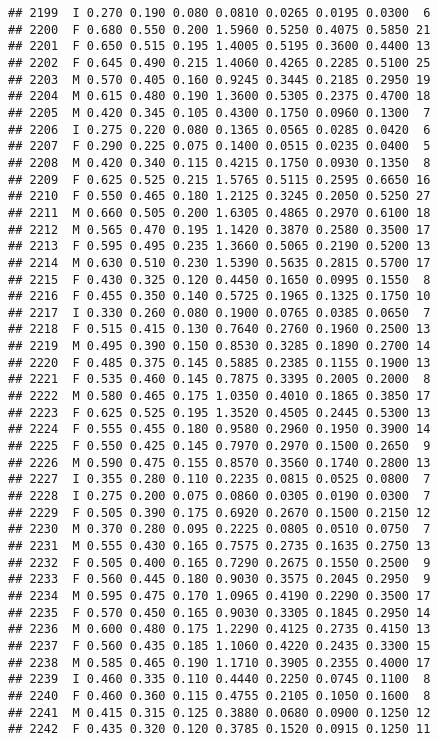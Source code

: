 \documentclass[
]{article}
\begin{document}
\begin{verbatim}
## 2199  I 0.270 0.190 0.080 0.0810 0.0265 0.0195 0.0300  6
## 2200  F 0.680 0.550 0.200 1.5960 0.5250 0.4075 0.5850 21
## 2201  F 0.650 0.515 0.195 1.4005 0.5195 0.3600 0.4400 13
## 2202  F 0.645 0.490 0.215 1.4060 0.4265 0.2285 0.5100 25
## 2203  M 0.570 0.405 0.160 0.9245 0.3445 0.2185 0.2950 19
## 2204  M 0.615 0.480 0.190 1.3600 0.5305 0.2375 0.4700 18
## 2205  M 0.420 0.345 0.105 0.4300 0.1750 0.0960 0.1300  7
## 2206  I 0.275 0.220 0.080 0.1365 0.0565 0.0285 0.0420  6
## 2207  F 0.290 0.225 0.075 0.1400 0.0515 0.0235 0.0400  5
## 2208  M 0.420 0.340 0.115 0.4215 0.1750 0.0930 0.1350  8
## 2209  F 0.625 0.525 0.215 1.5765 0.5115 0.2595 0.6650 16
## 2210  F 0.550 0.465 0.180 1.2125 0.3245 0.2050 0.5250 27
## 2211  M 0.660 0.505 0.200 1.6305 0.4865 0.2970 0.6100 18
## 2212  M 0.565 0.470 0.195 1.1420 0.3870 0.2580 0.3500 17
## 2213  F 0.595 0.495 0.235 1.3660 0.5065 0.2190 0.5200 13
## 2214  M 0.630 0.510 0.230 1.5390 0.5635 0.2815 0.5700 17
## 2215  F 0.430 0.325 0.120 0.4450 0.1650 0.0995 0.1550  8
## 2216  F 0.455 0.350 0.140 0.5725 0.1965 0.1325 0.1750 10
## 2217  I 0.330 0.260 0.080 0.1900 0.0765 0.0385 0.0650  7
## 2218  F 0.515 0.415 0.130 0.7640 0.2760 0.1960 0.2500 13
## 2219  M 0.495 0.390 0.150 0.8530 0.3285 0.1890 0.2700 14
## 2220  F 0.485 0.375 0.145 0.5885 0.2385 0.1155 0.1900 13
## 2221  F 0.535 0.460 0.145 0.7875 0.3395 0.2005 0.2000  8
## 2222  M 0.580 0.465 0.175 1.0350 0.4010 0.1865 0.3850 17
## 2223  F 0.625 0.525 0.195 1.3520 0.4505 0.2445 0.5300 13
## 2224  F 0.555 0.455 0.180 0.9580 0.2960 0.1950 0.3900 14
## 2225  F 0.550 0.425 0.145 0.7970 0.2970 0.1500 0.2650  9
## 2226  M 0.590 0.475 0.155 0.8570 0.3560 0.1740 0.2800 13
## 2227  I 0.355 0.280 0.110 0.2235 0.0815 0.0525 0.0800  7
## 2228  I 0.275 0.200 0.075 0.0860 0.0305 0.0190 0.0300  7
## 2229  F 0.505 0.390 0.175 0.6920 0.2670 0.1500 0.2150 12
## 2230  M 0.370 0.280 0.095 0.2225 0.0805 0.0510 0.0750  7
## 2231  M 0.555 0.430 0.165 0.7575 0.2735 0.1635 0.2750 13
## 2232  F 0.505 0.400 0.165 0.7290 0.2675 0.1550 0.2500  9
## 2233  F 0.560 0.445 0.180 0.9030 0.3575 0.2045 0.2950  9
## 2234  M 0.595 0.475 0.170 1.0965 0.4190 0.2290 0.3500 17
## 2235  F 0.570 0.450 0.165 0.9030 0.3305 0.1845 0.2950 14
## 2236  M 0.600 0.480 0.175 1.2290 0.4125 0.2735 0.4150 13
## 2237  F 0.560 0.435 0.185 1.1060 0.4220 0.2435 0.3300 15
## 2238  M 0.585 0.465 0.190 1.1710 0.3905 0.2355 0.4000 17
## 2239  I 0.460 0.335 0.110 0.4440 0.2250 0.0745 0.1100  8
## 2240  F 0.460 0.360 0.115 0.4755 0.2105 0.1050 0.1600  8
## 2241  M 0.415 0.315 0.125 0.3880 0.0680 0.0900 0.1250 12
## 2242  F 0.435 0.320 0.120 0.3785 0.1520 0.0915 0.1250 11

\end{verbatim}
\end{document}
